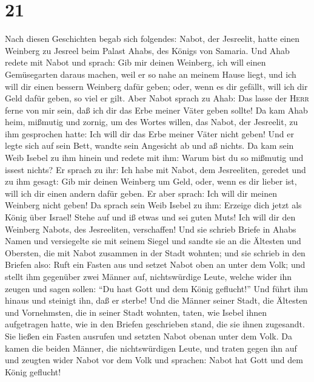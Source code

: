 \hypertarget{section-20}{%
\section{21}\label{section-20}}

 Nach diesen Geschichten begab sich folgendes: Nabot, der
Jesreelit, hatte einen Weinberg zu Jesreel beim Palast Ahabs, des Königs
von Samaria.  Und Ahab redete mit Nabot und sprach: Gib
mir deinen Weinberg, ich will einen Gemüsegarten daraus machen, weil er
so nahe an meinem Hause liegt, und ich will dir einen bessern Weinberg
dafür geben; oder, wenn es dir gefällt, will ich dir Geld dafür geben,
so viel er gilt.  Aber Nabot sprach zu Ahab: Das lasse der
\textsc{Herr} ferne von mir sein, daß ich dir das Erbe meiner Väter
geben sollte!  Da kam Ahab heim, mißmutig und zornig, um
des Wortes willen, das Nabot, der Jesreelit, zu ihm gesprochen hatte:
Ich will dir das Erbe meiner Väter nicht geben! Und er legte sich auf
sein Bett, wandte sein Angesicht ab und aß nichts.  Da kam
sein Weib Isebel zu ihm hinein und redete mit ihm: Warum bist du so
mißmutig und issest nichts?  Er sprach zu ihr: Ich habe
mit Nabot, dem Jesreeliten, geredet und zu ihm gesagt: Gib mir deinen
Weinberg um Geld, oder, wenn es dir lieber ist, will ich dir einen
andern dafür geben. Er aber sprach: Ich will dir meinen Weinberg nicht
geben!  Da sprach sein Weib Isebel zu ihm: Erzeige dich
jetzt als König über Israel! Stehe auf und iß etwas und sei guten Muts!
Ich will dir den Weinberg Nabots, des Jesreeliten, verschaffen!
 Und sie schrieb Briefe in Ahabs Namen und versiegelte sie
mit seinem Siegel und sandte sie an die Ältesten und Obersten, die mit
Nabot zusammen in der Stadt wohnten;  und sie schrieb in
den Briefen also: Ruft ein Fasten aus und setzet Nabot oben an unter dem
Volk;  und stellt ihm gegenüber zwei Männer auf,
nichtswürdige Leute, welche wider ihn zeugen und sagen sollen: ``Du hast
Gott und dem König geflucht!'' Und führt ihm hinaus und steinigt ihn,
daß er sterbe!  Und die Männer seiner Stadt, die Ältesten
und Vornehmsten, die in seiner Stadt wohnten, taten, wie Isebel ihnen
aufgetragen hatte, wie in den Briefen geschrieben stand, die sie ihnen
zugesandt.  Sie ließen ein Fasten ausrufen und setzten
Nabot obenan unter dem Volk.  Da kamen die beiden Männer,
die nichtswürdigen Leute, und traten gegen ihn auf und zeugten wider
Nabot vor dem Volk und sprachen: Nabot hat Gott und dem König geflucht!
